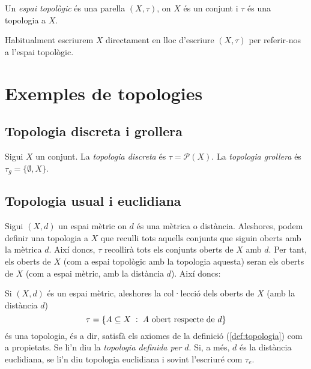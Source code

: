 \documentclass[../main.tex]{subfiles}
\begin{document}
\begin{defi}
\label{def:espaitopologic}  Un \textit{espai topològic} és una parella $(X,\tau)$, on $X$ és un conjunt i $\tau$ és una topologia a $X$.
\end{defi}

Habitualment escriurem $X$ directament en lloc d'escriure $(X,\tau)$ per referir-nos a l'espai topològic.

\section{Exemples de topologies}
\subsection{Topologia discreta i grollera}

\begin{defi}
\label{def:topologiagrollera}\label{def:topologiadiscreta} Sigui $X$ un conjunt. La \textit{topologia discreta} és $\tau = \mathscr{P}(X)$. La \textit{topologia grollera} és $\tau_g = \{\emptyset,X\}$.
\end{defi}

\subsection{Topologia usual i euclidiana}

Sigui $(X,d)$ un espai mètric on $d$ és una mètrica o distància. Aleshores, podem definir una topologia a $X$ que reculli tots aquells conjunts que siguin oberts amb la mètrica $d$. Així doncs, $\tau$ recollirà tots els conjunts oberts de $X$ amb $d$. Per tant, els oberts de $X$ (com a espai topològic amb la topologia aquesta) seran els oberts de $X$ (com a espai mètric, amb la distància $d$). Així doncs:

\begin{defi}
\label{def:topologiausual}\label{def:topologiaeuclidiana} Si $(X,d)$ és un espai mètric, aleshores la col·lecció dels oberts de $X$ (amb la distància $d$) 
    \begin{equation}
        \notag
        \tau = \{A\subseteq X\;:\;A\text{ obert respecte de }d\}
    \end{equation}
    és una topologia, és a dir, satisfà els axiomes de la definició (\ref{def:topologia}) com a propietats. Se li'n diu la \textit{topologia definida per $d$}\label{def:topologiadefinidaperd}. Si, a més, $d$ és la distància euclidiana, se li'n diu topologia euclidiana i sovint l'escriuré com $\tau_e$.
\end{defi}
\end{document}
